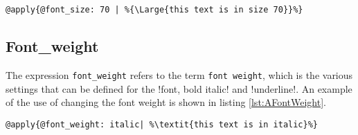 \begin{lstlisting}[frame=single, caption=Changing font size, label=lst:AFontSize]
	@apply{@font_size: 70 | %{\Large{this text is in size 70}}%}
\end{lstlisting}

\subsection{Font\_weight}
The expression \texttt{font\_weight} refers to the term \texttt{font weight}, which is the various settings that can be defined for the \lstline!font, bold italic! and \lstline!underline!. An example of the use of changing the font weight is shown in listing \ref{lst:AFontWeight}.

\begin{lstlisting}[frame=single, caption=Changing font weight, label=lst:AFontWeight]
	@apply{@font_weight: italic| %\textit{this text is in italic}%}
\end{lstlisting}